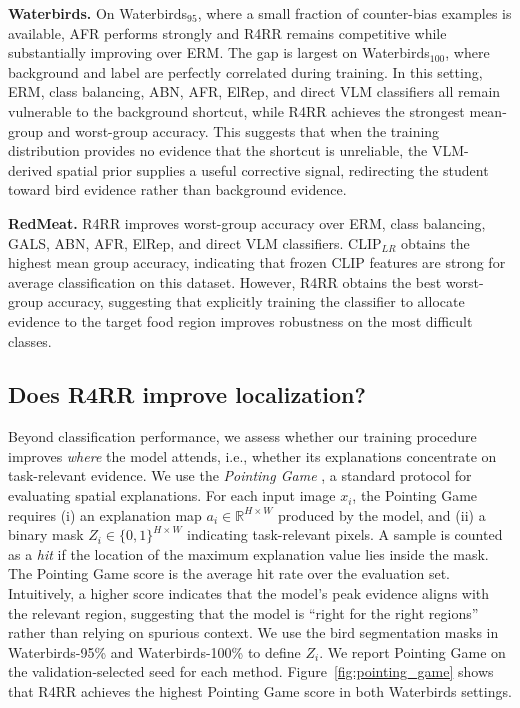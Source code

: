 \textbf{Waterbirds.}
On Waterbirds$_{95}$, where a small fraction of counter-bias examples is available, AFR performs strongly and R4RR remains competitive while substantially improving over ERM.
The gap is largest on Waterbirds$_{100}$, where background and label are perfectly correlated during training.
In this setting, ERM, class balancing, ABN, AFR, ElRep, and direct VLM classifiers all remain vulnerable to the background shortcut, while R4RR achieves the strongest mean-group and worst-group accuracy.
This suggests that when the training distribution provides no evidence that the shortcut is unreliable, the VLM-derived spatial prior supplies a useful corrective signal, redirecting the student toward bird evidence rather than background evidence.


\textbf{RedMeat.} R4RR improves worst-group accuracy over ERM, class balancing, GALS, ABN, AFR, ElRep, and direct VLM classifiers. CLIP$_{LR}$ obtains the highest mean group accuracy, indicating that frozen CLIP features are strong for average classification on this dataset. However, R4RR obtains the best worst-group accuracy, suggesting that explicitly training the classifier to allocate evidence to the target food region improves robustness on the most difficult classes. 


\subsection{Does R4RR improve localization?}\label{sec:pointing}

Beyond classification performance, we assess whether our training procedure improves \emph{where} the model attends, i.e., whether its explanations concentrate on task-relevant evidence. We use the \emph{Pointing Game} \cite{zhang2018top}, a standard protocol for evaluating spatial explanations. For each input image $x_i$, the Pointing Game requires (i) an explanation map $a_i \in \mathbb{R}^{H\times W}$ produced by the model, and (ii) a binary mask $Z_i \in \{0,1\}^{H\times W}$ indicating task-relevant pixels. A sample is counted as a \emph{hit} if the location of the maximum explanation value lies inside the mask. The Pointing Game score is the average hit rate over the evaluation set. Intuitively, a higher score indicates that the model's peak evidence aligns with the relevant region, suggesting that the model is ``right for the right regions'' rather than relying on spurious context. We use the bird segmentation masks in Waterbirds-95\% and Waterbirds-100\% to define $Z_i$. We report Pointing Game on the validation-selected seed for each method. Figure~\ref{fig:pointing_game} shows that R4RR achieves the highest Pointing Game score in both Waterbirds settings. 


